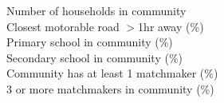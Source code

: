 Number of households in community \\
Closest motorable road $>$1hr away (\%) \\
Primary school in community (\%) \\
Secondary school in community (\%) \\
Community has at least 1 matchmaker (\%) \\
3 or more matchmakers in community (\%) \\